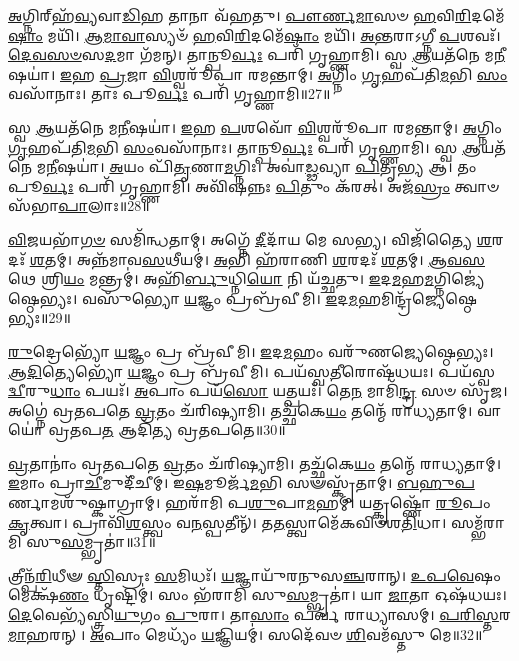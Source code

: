 \-\ul{𑌅}\-𑌗𑍍𑌨𑌿𑌰𑍍‌\mbox{}𑌹᳴\-\ul{𑌵𑍍𑌯}\-𑌵𑌾\-\ul{𑌡𑌿}\-𑌹 𑌤𑌾𑌨𑌾 𑌵᳴𑌹𑌤𑍁।
\-\ul{𑌪𑍗}\-\-\ul{𑌰𑍍𑌣}\-\-\ul{𑌮𑌾}\-𑌸𑍞 \ul{𑌹}\-𑌵𑌿\-\ul{𑌰𑌿}\-𑌦𑌮𑍇᳴\-\ul{𑌷𑌾𑌂} 𑌮𑌯𑌿᳴।
\-\ul{𑌆}\-\-\ul{𑌮𑌾}\-\-\ul{𑌵𑌾}\-𑌸𑍍𑌯𑍞᳴ \ul{𑌹}\-𑌵𑌿\-\ul{𑌰𑌿}\-𑌦𑌮𑍇᳴\-\ul{𑌷𑌾𑌂} 𑌮𑌯𑌿᳴।
\-\ul{𑌅}\-\-\ul{𑌨𑍍𑌤}\-𑌰𑌾\-𑌽𑌗𑍍𑌨𑍀 \ul{𑌪}\-𑌶𑌵𑌃᳴।
\-\ul{𑌦𑍇}\-\-\ul{𑌵}\-\-\ul{𑌸}\-\-\ul{𑍞}\-𑌸\-\ul{𑌦}\-𑌮𑌾 𑌗᳴𑌮𑌨𑍍।
𑌤𑌾𑌨𑍍𑌪𑍂\-\ul{𑌰𑍍𑌵𑌃} 𑌪𑌰𑌿᳴ 𑌗𑍃𑌹𑍍𑌣𑌾𑌮𑌿।
𑌸𑍍𑌵 \ul{𑌆}\-𑌯𑌤᳴𑌨𑍇 𑌮\-\ul{𑌨𑍀}\-𑌷𑌯𑌾॑।
\-\ul{𑌇}\-𑌹 \ul{𑌪𑍍𑌰}\-𑌜𑌾 \ul{𑌵𑌿}\-𑌶𑍍𑌵𑌰𑍂᳴𑌪𑌾 𑌰𑌮𑌨𑍍𑌤𑌾𑌮𑍍।
\-\ul{𑌅}\-𑌗𑍍𑌨𑌿𑌂 \ul{𑌗𑍃}\-𑌹𑌪᳴𑌤𑌿\-\ul{𑌮}\-𑌭𑌿 \ul{𑌸𑌂}\-𑌵𑌸𑌾᳴𑌨𑌾𑌃।
𑌤𑌾𑌃 𑌪𑍂\-\ul{𑌰𑍍𑌵𑌃} 𑌪𑌰𑌿᳴ 𑌗𑍃𑌹𑍍𑌣𑌾𑌮𑌿॥27॥

𑌸𑍍𑌵 \ul{𑌆}\-𑌯𑌤᳴𑌨𑍇 𑌮\-\ul{𑌨𑍀}\-𑌷𑌯𑌾॑।
\-\ul{𑌇}\-𑌹 \ul{𑌪}\-𑌶𑌵𑍋᳴ \ul{𑌵𑌿}\-𑌶𑍍𑌵𑌰𑍂᳴𑌪𑌾 𑌰𑌮𑌨𑍍𑌤𑌾𑌮𑍍।
\-\ul{𑌅}\-𑌗𑍍𑌨𑌿𑌂 \ul{𑌗𑍃}\-𑌹𑌪᳴𑌤𑌿\-\ul{𑌮}\-𑌭𑌿 \ul{𑌸𑌂}\-𑌵𑌸𑌾᳴𑌨𑌾𑌃।
𑌤𑌾𑌨𑍍𑌪𑍂\-\ul{𑌰𑍍𑌵𑌃} 𑌪𑌰𑌿᳴ 𑌗𑍃𑌹𑍍𑌣𑌾𑌮𑌿।
𑌸𑍍𑌵 \ul{𑌆}\-𑌯𑌤᳴𑌨𑍇 𑌮\-\ul{𑌨𑍀}\-𑌷𑌯𑌾॑।
\-\ul{𑌅}\-𑌯𑌂 𑌪𑌿᳴\-\ul{𑌤𑍃}\-𑌣𑌾\-\ul{𑌮}\-𑌗𑍍𑌨𑌿𑌃।
𑌅𑌵𑌾॑\-\ul{𑌡𑍍𑌢}\-𑌵𑍍𑌯𑌾 \ul{𑌪𑌿}\-𑌤𑍃\-\ul{𑌭𑍍𑌯} 𑌆।
𑌤𑌂 𑌪𑍂\-\ul{𑌰𑍍𑌵𑌃} 𑌪𑌰𑌿᳴ 𑌗𑍃𑌹𑍍𑌣𑌾𑌮𑌿।
𑌅𑌵𑌿᳴𑌷𑌨𑍍𑌨𑌃 \ul{𑌪𑌿}\-𑌤𑍁𑌂 𑌕᳴𑌰𑌤𑍍।
𑌅𑌜᳴\-\ul{𑌸𑍍𑌰𑌂} 𑌤𑍍𑌵𑌾𑍞 𑌸᳴𑌭𑌾\-\ul{𑌪𑌾}\-𑌲𑌾𑌃॥28॥

\-\ul{𑌵𑌿}\-\-\ul{𑌜}\-𑌯𑌭𑌾᳴\-\ul{𑌗}\-\-\ul{𑍞} 𑌸𑌮𑌿᳴𑌨𑍍𑌧𑌤𑌾𑌮𑍍।
𑌅𑌗𑍍𑌨𑍇᳴ \ul{𑌦𑍀}\-𑌦𑌾᳴𑌯 𑌮𑍇 𑌸𑌭𑍍𑌯।
𑌵𑌿𑌜𑌿᳴𑌤𑍍𑌯𑍈 \ul{𑌶}\-𑌰𑌦𑌃᳴ \ul{𑌶}\-𑌤𑌮𑍍।
𑌅𑌨𑍍𑌨᳴𑌮𑌾𑌵\-\ul{𑌸}\-𑌥𑍀𑌯𑌮𑍍॑।
\-\ul{𑌅}\-𑌭𑌿 𑌹᳴𑌰𑌾𑌣𑌿 \ul{𑌶}\-𑌰𑌦𑌃᳴ \ul{𑌶}\-𑌤𑌮𑍍।
\-\ul{𑌆}\-\-\ul{𑌵}\-\-\ul{𑌸}\-𑌥𑍇 𑌶𑍍𑌰𑌿\-\ul{𑌯𑌂} 𑌮𑌨𑍍𑌤𑍍𑌰𑌮𑍍॑।
𑌅𑌹𑌿᳴\-\ul{𑌰𑍍𑌬𑍁}\-𑌧𑍍𑌨𑌿\-\ul{𑌯𑍋} 𑌨𑌿 𑌯᳴𑌚𑍍𑌛𑌤𑍁।
\-\ul{𑌇}\-𑌦\-\ul{𑌮}\-𑌹\-\ul{𑌮}\-𑌗𑍍𑌨𑌿𑌜𑍍𑌯𑍇॑𑌷𑍍𑌠𑍇𑌭𑍍𑌯𑌃।
𑌵𑌸𑍁᳴𑌭𑍍𑌯𑍋 \ul{𑌯}\-𑌜𑍍𑌞𑌂 𑌪𑍍𑌰𑌬𑍍𑌰᳴𑌵𑍀𑌮𑌿।
\-\ul{𑌇}\-𑌦\-\ul{𑌮}\-𑌹𑌮𑌿𑌨𑍍𑌦𑍍𑌰᳴𑌜𑍍𑌯𑍇𑌷𑍍𑌠𑍇𑌭𑍍𑌯𑌃॥29॥

\-\ul{𑌰𑍁}\-𑌦𑍍𑌰𑍇𑌭𑍍𑌯𑍋᳴ \ul{𑌯}\-𑌜𑍍𑌞𑌂 𑌪𑍍𑌰 𑌬𑍍𑌰᳴𑌵𑍀𑌮𑌿।
\-\ul{𑌇}\-𑌦\-\ul{𑌮}\-𑌹𑌂 𑌵𑌰𑍁᳴𑌣𑌜𑍍𑌯𑍇𑌷𑍍𑌠𑍇𑌭𑍍𑌯𑌃।
\-\ul{𑌆}\-\-\ul{𑌦𑌿}\-𑌤𑍍𑌯𑍇𑌭𑍍𑌯𑍋᳴ \ul{𑌯}\-𑌜𑍍𑌞𑌂 𑌪𑍍𑌰 𑌬𑍍𑌰᳴𑌵𑍀𑌮𑌿।
𑌪𑌯᳴𑌸𑍍𑌵\-\ul{𑌤𑍀}\-𑌰𑍋𑌷᳴𑌧𑌯𑌃।
𑌪𑌯᳴𑌸𑍍𑌵\-\ul{𑌦𑍍𑌵𑍀}\-𑌰𑍁\-\ul{𑌧𑌾𑌂} 𑌪𑌯𑌃᳴।
\-\ul{𑌅}\-𑌪𑌾𑌂 𑌪𑌯᳴\-\ul{𑌸𑍋} 𑌯𑌤𑍍𑌪𑌯𑌃᳴।
𑌤𑍇\-\ul{𑌨} 𑌮𑌾𑌮𑌿᳴\-\ul{𑌨𑍍𑌦𑍍𑌰} 𑌸𑍞 𑌸𑍃᳴𑌜।
𑌅𑌗𑍍𑌨𑍇॑ 𑌵𑍍𑌰𑌤𑌪𑌤𑍇 \ul{𑌵𑍍𑌰}\-𑌤𑌂 𑌚᳴𑌰𑌿𑌷𑍍𑌯𑌾𑌮𑌿।
𑌤𑌚𑍍𑌛᳴𑌕𑍇\-\ul{𑌯𑌂} 𑌤𑌨𑍍𑌮𑍇᳴ 𑌰𑌾𑌧𑍍𑌯𑌤𑌾𑌮𑍍।
𑌵𑌾𑌯𑍋॑ 𑌵𑍍𑌰𑌤𑌪\-\ul{𑌤} 𑌆𑌦𑌿᳴𑌤𑍍𑌯 𑌵𑍍𑌰𑌤𑌪𑌤𑍇॥30॥

\-\ul{𑌵𑍍𑌰}\-𑌤𑌾𑌨𑌾𑌂॑ 𑌵𑍍𑌰𑌤𑌪𑌤𑍇 \ul{𑌵𑍍𑌰}\-𑌤𑌂 𑌚᳴𑌰𑌿𑌷𑍍𑌯𑌾𑌮𑌿।
𑌤𑌚𑍍𑌛᳴𑌕𑍇\-\ul{𑌯𑌂} 𑌤𑌨𑍍𑌮𑍇᳴ 𑌰𑌾𑌧𑍍𑌯𑌤𑌾𑌮𑍍।
\-\ul{𑌇}\-𑌮𑌾𑌂 𑌪𑍍𑌰𑌾\-\ul{𑌚𑍀}\-𑌮𑍁𑌦𑍀᳴𑌚𑍀𑌮𑍍।
𑌇\-\ul{𑌷}\-𑌮𑍂𑌰𑍍𑌜᳴\-\ul{𑌮}\-𑌭𑌿 𑌸𑍟𑌸𑍍𑌕𑍃᳴𑌤𑌾𑌮𑍍।
\-\ul{𑌬}\-\-\ul{𑌹𑍁}\-\-\ul{𑌪}\-𑌰𑍍𑌣𑌾𑌮𑌶𑍁᳴𑌷𑍍𑌕𑌾𑌗𑍍𑌰𑌾𑌮𑍍।
𑌹𑌰𑌾᳴𑌮𑌿 𑌪\-\ul{𑌶𑍁}\-𑌪𑌾\-\ul{𑌮}\-𑌹𑌮𑍍।
𑌯𑌤𑍍𑌕𑍃𑌷𑍍𑌣𑍋᳴ \ul{𑌰𑍂}\-𑌪𑌂 \ul{𑌕𑍃}\-𑌤𑍍𑌵𑌾।
𑌪𑍍𑌰𑌾𑌵𑌿᳴\-\ul{𑌶}\-𑌸𑍍𑌤𑍍𑌵𑌂 𑌵\-\ul{𑌨}\-𑌸𑍍𑌪𑌤𑍀𑌨𑍍᳴।
𑌤\-\ul{𑌤}\-𑌸𑍍𑌤𑍍𑌵𑌾𑌮𑍇᳴𑌕𑌵𑌿𑍞𑌶\-\ul{𑌤𑌿}\-𑌧𑌾।
𑌸𑌮𑍍𑌭᳴𑌰𑌾𑌮𑌿 𑌸𑍁\-\ul{𑌸}\-𑌮𑍍𑌭𑍃𑌤𑌾॑॥31॥

𑌤𑍍𑌰𑍀𑌨𑍍𑌪᳴\-\ul{𑌰𑌿}\-𑌧𑍀𑍟 \ul{𑌸𑍍𑌤𑌿}\-𑌸𑍍𑌰𑌃 \ul{𑌸}\-𑌮𑌿𑌧𑌃᳴।
\-\ul{𑌯}\-𑌜𑍍𑌞𑌾𑌯𑍁᳴𑌰𑌨𑍁\-𑌸\-\ul{𑌞𑍍𑌚}\-𑌰𑌾𑌨𑍍।
\-\ul{𑌉}\-\-\ul{𑌪}\-\-\ul{𑌵𑍇}\-𑌷𑌂 𑌮𑍇𑌕𑍍𑌷᳴\-\ul{𑌣𑌂} 𑌧𑍃𑌷𑍍𑌟𑌿𑌮𑍍॑।
𑌸𑌂 𑌭᳴𑌰𑌾𑌮𑌿 𑌸𑍁\-\ul{𑌸}\-𑌮𑍍𑌭𑍃𑌤𑌾॑।
𑌯𑌾 \ul{𑌜𑌾}\-𑌤𑌾 𑌓𑌷᳴𑌧𑌯𑌃।
\-\ul{𑌦𑍇}\-𑌵𑍇𑌭𑍍𑌯᳴𑌸𑍍𑌤𑍍𑌰𑌿\-\ul{𑌯𑍁}\-𑌗𑌂 \ul{𑌪𑍁}\-𑌰𑌾।
𑌤𑌾\-\ul{𑌸𑌾𑌂} 𑌪𑌰𑍍𑌵᳴ 𑌰𑌾𑌧𑍍𑌯𑌾𑌸𑌮𑍍।
\-\ul{𑌪}\-\-\ul{𑌰𑌿}\-\-\ul{𑌸𑍍𑌤}\-𑌰\-\ul{𑌮𑌾}\-𑌹𑌰𑌨𑍍।
\-\ul{𑌅}\-𑌪𑌾𑌂 𑌮𑍇𑌧𑍍𑌯𑌂᳴ \ul{𑌯}\-𑌜𑍍𑌞𑌿𑌯𑌮𑍍॑।
𑌸𑌦𑍇᳴𑌵𑍞 \ul{𑌶𑌿}\-𑌵𑌮᳴𑌸𑍍𑌤𑍁 𑌮𑍇॥32॥

